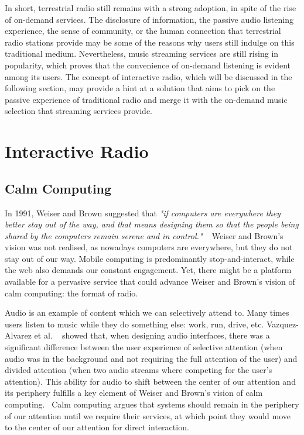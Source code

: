 In short, terrestrial radio still remains with a strong adoption, in spite of the rise of on-demand services. The disclosure of information, the passive audio listening experience, the sense of community, or the human connection that terrestrial radio stations provide may be some of the reasons why users still indulge on this traditional medium. Nevertheless, music streaming services are still rising in popularity, which proves that the convenience of on-demand listening is evident among its users. The concept of interactive radio, which will be discussed in the following section, may provide a hint at a solution that aims to pick on the passive experience of traditional radio and merge it with the on-demand music selection that streaming services provide.

\section{Interactive Radio}

\subsection{Calm Computing}

In 1991, Weiser and Brown suggested that \textit{"if computers are everywhere they better stay out of the way, and that means designing them so that the people being shared by the computers remain serene and in control."} ~\cite{Weiser1997} Weiser and Brown’s vision was not realised, as nowadays computers are everywhere, but they do not stay out of our way. Mobile computing is predominantly stop-and-interact, while the web also demands our constant engagement. Yet, there might be a platform available for a pervasive service that could advance Weiser and Brown’s vision of calm computing: the format of radio.

Audio is an example of content which we can selectively attend to. Many times users listen to music while they do something else: work, run, drive, etc. Vazquez-Alvarez et al. ~\cite{Vazquez-Alvarez2011} showed that, when designing audio interfaces, there was a significant difference between the user experience of selective attention (when audio was in the background and not requiring the full attention of the user) and divided attention (when two audio streams where competing for the user’s attention). This ability for audio to shift between the center of our attention and its periphery fulfills a key element of Weiser and Brown’s vision of calm computing.~\cite{Weiser1997} Calm computing argues that systems should remain in the periphery of our attention until we require their services, at which point they would move to the center of our attention for direct interaction.


